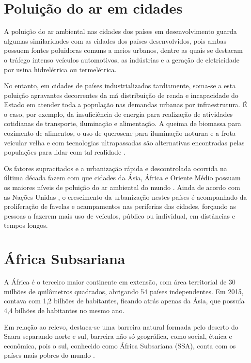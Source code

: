 \section{Poluição do ar em cidades}

A poluição do ar ambiental nas cidades dos países em desenvolvimento
guarda algumas similaridades com as cidades dos países desenvolvidos, pois
ambas possuem fontes poluidoras comuns a meios urbanos, dentre as quais se 
destacam o tráfego intenso veículos automotivos, as indústrias e a geração de
eletricidade por usina hidrelétrica ou termelétrica.

No entanto, em cidades de países industrializados tardiamente, soma-se a esta 
poluição agravantes decorrentes da má distribuição de 
renda e incapacidade do Estado em atender toda a população nas demandas urbanas 
por infraestrutura. É o caso, por exemplo, da insuficiência de energia para 
realização de atividades cotidianas de transporte, iluminação e alimentação. 
A queima de biomassa para cozimento de alimentos, o uso de querosene para 
iluminação noturna e a frota veicular velha e com tecnologias 
ultrapassadas são alternativas encontradas pelas populações para lidar 
com tal realidade \citep{brauer2012}.

Os fatores supracitados e a urbanização rápida e descontrolada ocorrida na
última década fazem com que cidades da Ásia, África e Oriente 
Médio possuam os maiores níveis de poluição do ar ambiental do mundo 
\citep{brauer2012}. Ainda de acordo com as Nações Unidas \citeyearpar{UN}, 
o crescimento da urbanização nestes países é acompanhado da proliferação de 
favelas e acampamentos nas periferias das cidades, forçando as pessoas a 
fazerem mais uso de veículos, público ou individual, em distâncias e 
tempos longos. 
	
\section{África Subsariana}

A África é o terceiro maior continente em extensão, com área territorial 
de 30 milhões de quilômetros quadrados, abrigando 54 países independentes. 
Em 2015, contava com 1,2 bilhões de habitantes, ficando atrás 
apenas da Ásia, que possuía 4,4 bilhões de habitantes no mesmo ano.
 
Em relação ao relevo, destaca-se uma barreira natural formada pelo deserto do 
Saara separando norte e sul, barreira não só geográfica, como social, étnica 
e econômica, pois o sul, conhecido como África Subsariana (SSA), 
conta com os países mais pobres do mundo \citep{UN}. 

